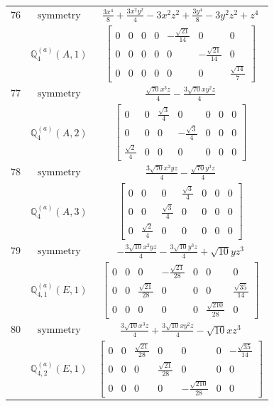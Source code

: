 \documentclass[fleqn,8pt,landscape]{jsarticle}
\begin{document}
\begin{longtable}{ccc}
$ 76 $ & $ \text{symmetry} $ & $ \frac{3 x^{4}}{8} + \frac{3 x^{2} y^{2}}{4} - 3 x^{2} z^{2} + \frac{3 y^{4}}{8} - 3 y^{2} z^{2} + z^{4} $ \\
$  $ & $ \mathbb{Q}_{4}^{(a)}(A,1) $ & $ \begin{bmatrix} 0 & 0 & 0 & 0 & - \frac{\sqrt{21}}{14} & 0 & 0 \\ 0 & 0 & 0 & 0 & 0 & - \frac{\sqrt{21}}{14} & 0 \\ 0 & 0 & 0 & 0 & 0 & 0 & \frac{\sqrt{14}}{7} \end{bmatrix} $ \\ \hline
$ 77 $ & $ \text{symmetry} $ & $ \frac{\sqrt{70} x^{3} z}{4} - \frac{3 \sqrt{70} x y^{2} z}{4} $ \\
$  $ & $ \mathbb{Q}_{4}^{(a)}(A,2) $ & $ \begin{bmatrix} 0 & 0 & \frac{\sqrt{3}}{4} & 0 & 0 & 0 & 0 \\ 0 & 0 & 0 & - \frac{\sqrt{3}}{4} & 0 & 0 & 0 \\ \frac{\sqrt{2}}{4} & 0 & 0 & 0 & 0 & 0 & 0 \end{bmatrix} $ \\ \hline
$ 78 $ & $ \text{symmetry} $ & $ \frac{3 \sqrt{70} x^{2} y z}{4} - \frac{\sqrt{70} y^{3} z}{4} $ \\
$  $ & $ \mathbb{Q}_{4}^{(a)}(A,3) $ & $ \begin{bmatrix} 0 & 0 & 0 & \frac{\sqrt{3}}{4} & 0 & 0 & 0 \\ 0 & 0 & \frac{\sqrt{3}}{4} & 0 & 0 & 0 & 0 \\ 0 & \frac{\sqrt{2}}{4} & 0 & 0 & 0 & 0 & 0 \end{bmatrix} $ \\ \hline
$ 79 $ & $ \text{symmetry} $ & $ - \frac{3 \sqrt{10} x^{2} y z}{4} - \frac{3 \sqrt{10} y^{3} z}{4} + \sqrt{10} y z^{3} $ \\
$  $ & $ \mathbb{Q}_{4,1}^{(a)}(E,1) $ & $ \begin{bmatrix} 0 & 0 & 0 & - \frac{\sqrt{21}}{28} & 0 & 0 & 0 \\ 0 & 0 & \frac{\sqrt{21}}{28} & 0 & 0 & 0 & \frac{\sqrt{35}}{14} \\ 0 & 0 & 0 & 0 & 0 & \frac{\sqrt{210}}{28} & 0 \end{bmatrix} $ \\ \hline
$ 80 $ & $ \text{symmetry} $ & $ \frac{3 \sqrt{10} x^{3} z}{4} + \frac{3 \sqrt{10} x y^{2} z}{4} - \sqrt{10} x z^{3} $ \\
$  $ & $ \mathbb{Q}_{4,2}^{(a)}(E,1) $ & $ \begin{bmatrix} 0 & 0 & \frac{\sqrt{21}}{28} & 0 & 0 & 0 & - \frac{\sqrt{35}}{14} \\ 0 & 0 & 0 & \frac{\sqrt{21}}{28} & 0 & 0 & 0 \\ 0 & 0 & 0 & 0 & - \frac{\sqrt{210}}{28} & 0 & 0 \end{bmatrix} $ \\ \hline

\end{longtable}
\end{document}

